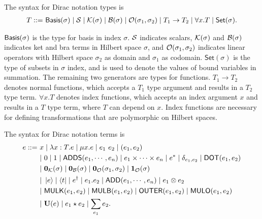 \documentclass[runningheads]{llncs}
\begin{document}
\begin{definition}
    The syntax for Dirac notation types is
    \begin{align*}
        T ::=\ & \mathsf{Basis}(\sigma) \mid \mathcal{S} \mid \mathcal{K}(\sigma) \mid \mathcal{B}(\sigma) \mid \mathcal{O}(\sigma_1, \sigma_2) \mid T_1 \to T_2 \mid \forall x.T \mid \mathsf{Set}(\sigma). \\
    \end{align*}
\end{definition}
$\mathsf{Basis}(\sigma)$ is the type for basis in index $\sigma$. $\mathcal{S}$ indicates scalars, $\mathcal{K}(\sigma)$ and $\mathcal{B}(\sigma)$ indicates ket and bra terms in Hilbert space $\sigma$, and $\mathcal{O}(\sigma_1, \sigma_2)$ indicates linear operators with Hilbert space $\sigma_2$ as domain and $\sigma_1$ as codomain.
$\mathsf{Set}(\sigma)$ is the type of subsets in $\sigma$ index, and is used to denote the values of bound variables in summation.
The remaining two generators are types for functions. $T_1 \to T_2$ denotes normal functions, which accepts a $T_1$ type argument and results in a $T_2$ type term. $\forall x. T$ denotes index functions, which accepts an index argument $x$ and results in a $T$ type term, where $T$ can depend on $x$.
Index functions are necessary for defining transformations that are polymorphic on Hilbert spaces.

\begin{definition}
    The syntax for Dirac notation terms is
    \begin{align*}
        e ::=\ & x \mid \lambda x : T.e \mid \mu x.e \mid e_1\ e_2 \mid (e_1, e_2) \\
        & |\ 0 \mid 1 \mid \mathsf{ADDS}(e_1, \cdots, e_n)  \mid e_1 \times \cdots \times e_n \mid e^*  \mid \delta_{e_1, e_2} \mid \mathsf{DOT}(e_1, e_2) \\
        & |\ \mathbf{0}_\mathcal{K}(\sigma) \mid \mathbf{0}_\mathcal{B}(\sigma) \mid \mathbf{0}_\mathcal{O}(\sigma_1, \sigma_2) \mid \mathbf{1}_\mathcal{O}(\sigma) \\
        & |\ \ket{e} \mid \bra{t} \mid e^\dagger \mid e_1.e_2 \mid \mathsf{ADD}(e_1, \cdots, e_n) \mid e_1 \otimes e_2 \\
        & |\ \mathsf{MULK}(e_1, e_2) \mid \mathsf{MULB}(e_1, e_2) \mid \mathsf{OUTER}(e_1, e_2) \mid \mathsf{MULO}(e_1, e_2) \\
        & |\ \mathbf{U}(e) \mid e_1 \star e_2 \mid \sum_{e_1} e_2.
    \end{align*}
\end{definition}
\end{document}
